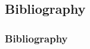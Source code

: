 \documentclass{beamer}
\begin{document}

\begin{frame}
    \section{Bibliography}
    \frametitle{Bibliography}   
    \nocite{*}
    \printbibliography[heading=none]
\end{frame}
\end{document}
